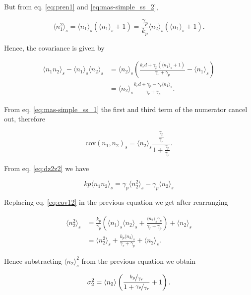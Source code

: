 But from eq. \eqref{eq:pren1} and \eqref{eq:mas-simple_ss_2},

\begin{equation}
\langle n_1^2 \rangle_s = \langle n_1 \rangle_s\left( \langle n_1 \rangle_s+1\right) = \frac{\gamma_p}{k_p}\langle n_2 \rangle_s\left(\langle n_1\rangle_s + 1\right).
\end{equation}

Hence, the covariance is given by

\begin{align*}
  \langle n_1n_2 \rangle_s - \langle n_1 \rangle_s\langle n_2\rangle_s &= \langle n_2 \rangle_s \left(\frac{k_rd+\gamma_p\left(\langle n_1\rangle_s+1\right)}{\gamma_r+\gamma_p}-\langle n_1\rangle_s\right)\\
  &=\langle n_2\rangle_s\frac{k_rd+\gamma_p-\gamma_r\langle n_1\rangle_s}{\gamma_r+\gamma_p}.
\end{align*}

From eq. \eqref{eq:mas-simple_ss_1} the first and third term of the numerator cancel out, therefore

\begin{equation}
  \label{eq:cov12}
  \boxed{\text{cov}(n_1,n_2)_s = \langle n_2 \rangle_s\frac{\frac{\gamma_p}{\gamma_r}}{1+\frac{\gamma_p}{\gamma_r}}}.
\end{equation}

From eq. \ref{eq:dz2z2} we have

\begin{equation*}
kp\langle n_1n_2\rangle_s = \gamma_p\langle n_2^2\rangle_s-\gamma_p\langle n_2\rangle_s
\end{equation*}

Replacing eq. \ref{eq:cov12} in the previous equation we get after rearranging

\begin{align*}
  \langle n_2^2\rangle_s &= \frac{k_p}{\gamma_p}\left(\langle n_1 \rangle_s\langle n_2\rangle_s + \frac{\langle n_2\rangle_s\gamma_p}{\gamma_r+\gamma_p}\right) + \langle n_2 \rangle_s\\
  &=\langle n_2^2\rangle_s+\frac{k_p\langle n_2\rangle_s}{\gamma_r+\gamma_p}+\langle n_2 \rangle_s.
\end{align*}

Hence substracting $\langle n_2\rangle_s^2$ from the previous equation we obtain

\begin{equation*}
  \sigma_2^2 = \langle n_2\rangle\left(\frac{\nicefrac{k_p}{\gamma_r}}{1+\nicefrac{\gamma_p}{\gamma_r}}+1\right).
\end{equation*}


